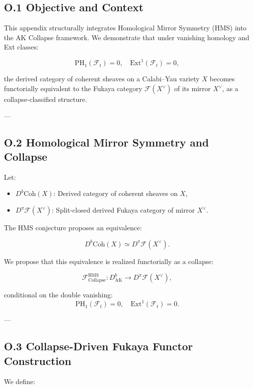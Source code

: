 \documentclass[11pt]{article}
\begin{document}
\subsection*{O.1 Objective and Context}

This appendix structurally integrates Homological Mirror Symmetry (HMS) into the AK Collapse framework. We demonstrate that under vanishing homology and Ext classes:

\[
\mathrm{PH}_1(\mathcal{F}_t) = 0, \quad \mathrm{Ext}^1(\mathcal{F}_t) = 0,
\]

the derived category of coherent sheaves on a Calabi–Yau variety $X$ becomes functorially equivalent to the Fukaya category $\mathcal{F}(X^\vee)$ of its mirror $X^\vee$, as a collapse-classified structure.

---

\subsection*{O.2 Homological Mirror Symmetry and Collapse}

Let:

\begin{itemize}
  \item $D^b\mathrm{Coh}(X)$: Derived category of coherent sheaves on $X$,
  \item $D^\pi\mathcal{F}(X^\vee)$: Split-closed derived Fukaya category of mirror $X^\vee$.
\end{itemize}

The HMS conjecture proposes an equivalence:

\[
D^b\mathrm{Coh}(X) \simeq D^\pi\mathcal{F}(X^\vee).
\]

We propose that this equivalence is realized functorially as a collapse:

\begin{equation}
\mathcal{F}_{\mathrm{Collapse}}^{\mathrm{HMS}} : D^b_{\mathrm{AK}} \to D^\pi\mathcal{F}(X^\vee),
\end{equation}

conditional on the double vanishing:
\[
\mathrm{PH}_1(\mathcal{F}_t) = 0, \quad \mathrm{Ext}^1(\mathcal{F}_t) = 0.
\]

---

\subsection*{O.3 Collapse-Driven Fukaya Functor Construction}

We define:
\end{document}

